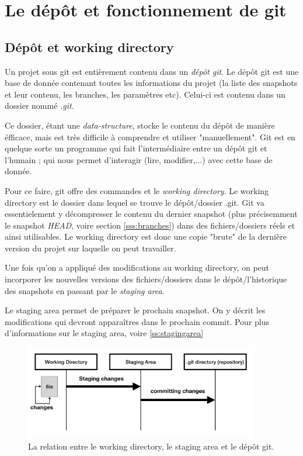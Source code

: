 \documentclass[a4paper, 12pt]{article}
\begin{document}
    
    \section{Le dépôt et fonctionnement de git}\label{s:dépôt}
    \subsection{Dépôt et working directory}
    Un projet sous git est entièrement contenu dans un \emph{dépôt git}. Le
    dépôt git est une base de donnée contenant toutes les informations du
    projet (la liste des snapshots et leur contenu, les branches, les paramètres
    etc). Celui-ci est contenu dans un dossier nommé \textit{.git}.

    Ce dossier, étant une \textit{data-structure}, stocke le contenu du dépôt de
    manière éfficace, mais est très difficile à comprendre et utiliser
    "manuellement". Git est en quelque sorte un programme qui fait
    l'intermédiaire entre un dépôt git et l'humain ; qui nous permet d'interagir
    (lire, modifier,...) avec cette base de donnée.

    Pour ce faire, git offre des commandes et le \textit{working directory}.
    Le working directory est le dossier dans lequel se trouve le dépôt/dossier
    .git. Git va essentielement y décompresser le contenu du dernier snapshot
    (plus précisemment le snapshot \textit{HEAD}, voire section
    \ref{sss:branches}) dans des fichiers/dossiers réels et ainsi utilisables.
    Le working directory est donc une copie "brute" de la dernière version du
    projet sur laquelle on peut travailler. 

    Une fois qu'on a appliqué des modifications au working directory, on peut
    incorporer les nouvelles versions des fichiers/dossiers dans le 
    dépôt/l'historique des snapshots en passant par le \textit{staging area}.

    Le staging area permet de préparer le prochain snapshot. On y décrit les
    modifications qui devront apparaîtres dans le prochain commit. Pour plus
    d'informations sur le staging area, voire \ref{ss:stagingarea}
    
    \begin{figure}[H]
        \centering
        \includegraphics[width=0.9\textwidth]{figs/three_areas.png}
        \caption{La relation entre le working directory, le staging area et le
        dépôt git.}
        \label{fig:3areas}
    \end{figure}
\end{document}
